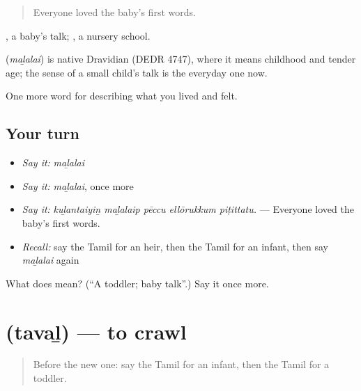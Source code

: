 \begin{quote}
Everyone loved the baby’s first words.
\end{quote}

 , a baby’s talk;  , a nursery school.

\begin{cousinweb}
\textbf{} (\emph{maḻalai}) is native Dravidian (DEDR 4747), where it means childhood and tender age; the sense of a small child's talk is the everyday one now.
\end{cousinweb}

\begin{grammarlens}[title={What you've built}]
One more word for describing what you lived and felt.
\end{grammarlens}

\subsection*{Your turn}
\begin{itemize}
\raggedright
  \item \emph{Say it:} \emph{maḻalai}
  \item \emph{Say it:} \emph{maḻalai}, once more
  \item \emph{Say it:} \emph{kuḻantaiyiṉ maḻalaip pēccu ellōrukkum piṭittatu.} — Everyone loved the baby’s first words.
  \item \emph{Recall:} say the Tamil for an heir, then the Tamil for an infant, then say \emph{maḻalai} again
\end{itemize}

\begin{tcolorbox}[breakable,colback=teal!4,colframe=teal!35!black,title={Before you move on}]
What does  mean? (\textquotedblleft{}A toddler; baby talk\textquotedblright{}.) Say it once more.
\end{tcolorbox}
\section[\texorpdfstring{\ta{தவழ்} (tavaḻ)}{தவழ் (tavaḻ)}]{ (tavaḻ) — to crawl}

\label{lesson:TA-C495-taval}



\begin{quote}
Before the new one: say the Tamil for an infant, then the Tamil for a toddler.
\end{quote}

